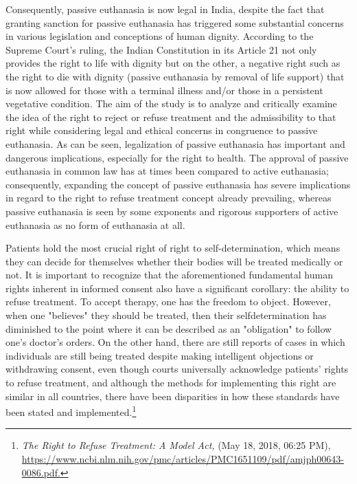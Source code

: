 \begin{multicols}{2}

\noi
Consequently, passive euthanasia is now legal in India, despite the fact that granting sanction
for passive euthanasia has triggered some substantial concerns in various legislation and
conceptions of human dignity. According to the Supreme Court's ruling, the Indian
Constitution in its Article 21 not only provides the right to life with dignity but on the other, a
negative right such as the right to die with dignity (passive euthanasia by removal of life
support) that is now allowed for those with a terminal illness and/or those in a persistent
vegetative condition. The aim of the study is to analyze and critically examine the idea of the
right to reject or refuse treatment and the admissibility to that right while considering legal
and ethical concerns in congruence to passive euthanasia. As can be seen, legalization of
passive euthanasia has important and dangerous implications, especially for the right to
health. The approval of passive euthanasia in common law has at times been compared to
active euthanasia; consequently, expanding the concept of passive euthanasia has severe
implications in regard to the right to refuse treatment concept already prevailing, whereas
passive euthanasia is seen by some exponents and rigorous supporters of active euthanasia as
no form of euthanasia at all.


\noi
Patients hold the most crucial right of right to self-determination, which means they can
decide for themselves whether their bodies will be treated medically or not. It is important to
recognize that the aforementioned fundamental human rights inherent in informed consent
also have a significant corollary: the ability to refuse treatment. To accept therapy, one has
the freedom to object. However, when one "believes" they should be treated, then their selfdetermination has diminished to the point where it can be described as an "obligation" to
follow one's doctor's orders. On the other hand, there are still reports of cases in which
individuals are still being treated despite making intelligent objections or withdrawing
consent, even though courts universally acknowledge patients' rights to refuse treatment, and
although the methods for implementing this right are similar in all countries, there have been
disparities in how these standards have been stated and implemented.\footnote{\textit{The Right to Refuse Treatment: A Model Act,} (May 18, 2018, 06:25 PM), \url{https://www.ncbi.nlm.nih.gov/pmc/articles/PMC1651109/pdf/amjph00643-0086.pdf.}}


\end{multicols}
